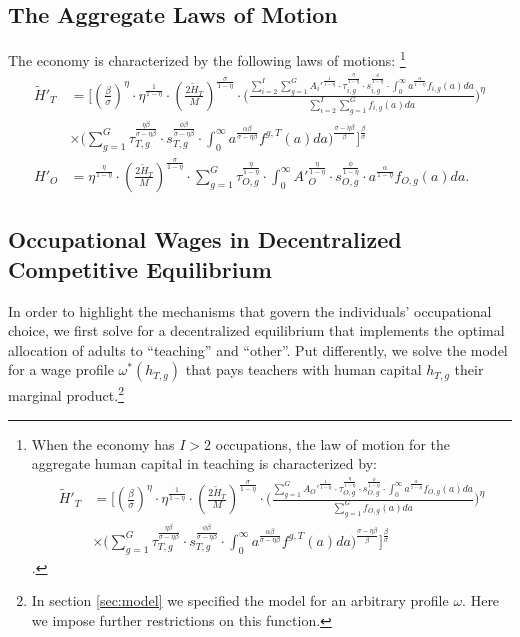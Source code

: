\documentclass[onehalfspacing,11pt]{article}
\newtheorem{prp}{Proposition}
\begin{document}
		\subsection{The Aggregate Laws of Motion}
		The economy is characterized by the following laws of motions: \footnote{When the economy has $I>2$ occupations, the law of motion for the aggregate human capital in teaching is characterized by:
			\begin{align*}
				\widetilde{H}'_{T} & = \Bigg[ \left(\tfrac{\beta}{\sigma}\right)^\eta \cdot\eta^{\frac{1}{1-\eta}} \cdot \left(\tfrac{2\widetilde{H}_T}{M}\right)^{\frac{\sigma}{1-\eta}} \cdot \Bigg( \frac{\sum_{g=1}^G {A_O'}^\frac{1}{1-\eta}\cdot\tau_{O,g}^\frac{\eta}{1-\eta} \cdot s_{O,g}^\frac{\phi}{1-\eta}\cdot \int_0^\infty a^{\frac{\alpha}{1-\eta}} f_{O,g}(a)da}{\sum_{g=1}^G f_{O,g}(a)da} \Bigg)^\eta \nonumber\\
				& \times \Bigg(\sum_{g=1}^G \tau_{T,g}^\frac{\eta\beta }{\sigma-\eta\beta } \cdot s_{T,g}^\frac{\phi\beta }{\sigma-\eta\beta } \cdot \int_0^\infty a^\frac{\alpha\beta}{\sigma-\eta\beta } f^{g,T}(a)da \Bigg)^\frac{\sigma-\eta\beta}{\beta} \Bigg]^\frac{\beta}{\sigma}
			\end{align*}.
		}
		\begin{align}
			\widetilde{H}'_{T} & = \Bigg[ \left(\tfrac{\beta}{\sigma}\right)^\eta \cdot\eta^{\frac{1}{1-\eta}} \cdot \left(\tfrac{2\widetilde{H}_T}{M}\right)^{\frac{\sigma}{1-\eta}} \cdot \Bigg( \frac{\sum_{i=2}^I \sum_{g=1}^G {A_i'}^\frac{1}{1-\eta}\cdot\tau_{i,g}^\frac{\eta}{1-\eta} \cdot s_{i,g}^\frac{\phi}{1-\eta}\cdot \int_0^\infty a^{\frac{\alpha}{1-\eta}} f_{i,g}(a)da}{\sum_{i=2}^I \sum_{g=1}^G f_{i,g}(a)da} \Bigg)^\eta \nonumber\\
			& \times \Bigg(\sum_{g=1}^G \tau_{T,g}^\frac{\eta\beta }{\sigma-\eta\beta } \cdot s_{T,g}^\frac{\phi\beta }{\sigma-\eta\beta } \cdot \int_0^\infty a^\frac{\alpha\beta}{\sigma-\eta\beta } f^{g,T}(a)da \Bigg)^\frac{\sigma-\eta\beta}{\beta} \Bigg]^\frac{\beta}{\sigma}\\
			{H}'_{O} & = \eta^\frac{\eta}{1-\eta} \cdot \left(\tfrac{2\widetilde{H}_T}{M}\right)^\frac{\sigma}{1-\eta}\cdot \sum_{g=1}^G \tau_{O,g}^\frac{\eta}{1-\eta} \cdot \int_0^\infty {A'}_O^\frac{\eta}{1-\eta} \cdot s_{O,g}^\frac{\phi}{1-\eta} \cdot a^{\frac{\alpha}{1-\eta}} f_{O,g}(a)da.
		\end{align}
		
		\subsection{Occupational Wages in Decentralized Competitive Equilibrium}
		In order to highlight the mechanisms that govern the individuals' occupational choice, we first solve for a decentralized equilibrium that implements the optimal allocation of adults to ``teaching'' and ``other''. Put differently, we solve the model for a wage profile $\omega^*(h_{T,g})$ that pays teachers with human capital $h_{T,g}$ their marginal product.\footnote{In section \ref{sec:model} we specified the model for an arbitrary profile $\omega$. Here we impose further restrictions on this function.}
		
\end{document}
